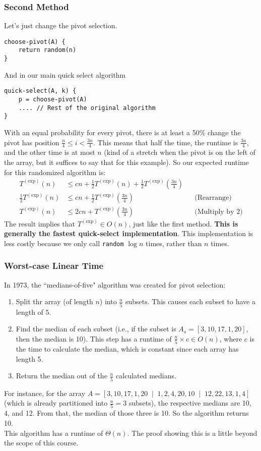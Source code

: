 \documentclass{report}
\begin{document}
\subsubsection{Second Method}
Let's just change the pivot selection.
\begin{lstlisting}
choose-pivot(A) {
	return random(n)
}
\end{lstlisting}
And in our main quick select algorithm
\begin{lstlisting}
quick-select(A, k) {
	p = choose-pivot(A)
	.... // Rest of the original algorithm
}
\end{lstlisting}
With an equal probability for every pivot, there is at least a 50\% change the pivot has position $\frac{n}{4} \leq i < \frac{3n}{4}$. This means that half the time, the runtime is $\frac{3n}{4}$, and the other time is at most $n$ (kind of a stretch when the pivot is on the left of the array, but it suffices to say that for this example). So our expected runtime for this randomized algorithm is:
\begin{align*}
T^{(\mathrm{exp})}(n) &\leq cn+ \frac{1}{2}T^{(\mathrm{exp})}(n) + \frac{1}{2}T^{(\mathrm{exp})}\left(\frac{3n}{4}\right) \\
\frac{1}{2} T^{(\mathrm{exp})}(n) &\leq cn + \frac{1}{2}T^{(\mathrm{exp})}\left(\frac{3n}{4}\right) && \text{(Rearrange)}\\
T^{(\mathrm{exp})}(n) &\leq 2cn + T^{(\mathrm{exp})}\left(\frac{3n}{4}\right) && \text{(Multiply by 2)}
\end{align*}
The result implies that $T^{(\mathrm{exp})} \in O(n)$, just like the first method. \textbf{This is generally the fastest quick-select implementation}. This implementation is less costly because we only call \texttt{random} $\log n$ times, rather than $n$ times.
\subsubsection{Worst-case Linear Time}
In 1973, the ``medians-of-five" algorithm was created for pivot selection:
\begin{enumerate}
\item Split thr array (of length $n$) into $\frac{n}{5}$ subsets. This causes each subset to have a length of 5.
\item Find the median of each subset (i.e., if the subset is $A_s = [3, 10, 17, 1, 20]$, then the median is 10). This step has a runtime of $\frac{n}{5} \times c \in O(n)$, where $c$ is the time to calculate the median, which is constant since each array has length 5.
\item Return the median out of the $\frac{n}{5}$ calculated medians.
\end{enumerate}
For instance, for the array $A = [3, 10, 17, 1, 20 \;\;\vert\;\; 1, 2, 4, 20, 10 \;\;\vert\;\; 12, 22, 13, 1, 4]$ (which is already partitioned into $\frac{n}{5}= 3$ subsets), the respective medians are 10, 4, and 12. From that, the median of those three is 10. So the algorithm returns 10.\\
This algorithm has a runtime of $\Theta(n)$. The proof showing this is a little beyond the scope of this course.\newpage
\end{document}

